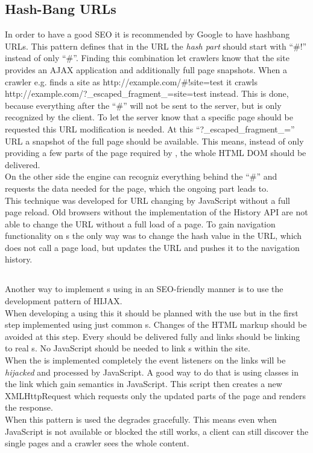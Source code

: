 \subsection{Hash-Bang URLs\label{hashbangurls}}
In order to have a good SEO it is recommended by Google to have hashbang URLs.
This pattern defines that in the URL the \emph{hash part} should start with \enquote{\#!} instead of only \enquote{\#}.
Finding this combination let crawlers know that the site provides an AJAX application and additionally full page snapshots.
When a crawler e.g. finds a site as http://example.com/\#!site=test it crawls \newline http://example.com/?\_escaped\_fragment\_=site=test instead.
This is done, because everything after the \enquote{\#} will not be sent to the server, but is only recognized by the client.
To let the server know that a specific page should be requested this URL modification is needed.
At this \enquote{?\_escaped\_fragment\_=} URL a snapshot of the full page should be available.
This means, instead of only providing a few parts of the page required by \ajax{}, the whole HTML DOM should be delivered.
\\
On the other side the \ajax{} engine can recogniz everything behind the \enquote{\#} and requests the data needed for the page, which the ongoing part leads to.
\\
This technique was developed for URL changing by JavaScript without a full page reload.
Old browsers without the implementation of the History API are not able to change the URL without a full load of a page.
To gain navigation functionality on \singlePageApplication{}s the only way was to change the hash value in the URL, which does not call a page load, but updates the URL and pushes it to the navigation history.

\subsection{\hijax{}\label{hijax}}
Another way to implement \singlePageApplication{}s using \ajax{} in an SEO-friendly manner is to use the development pattern of HIJAX.
\\
When developing a \webSite{} using this it should be planned with the use \ajax{} but in the first step implemented using just common \httpRequest{}s.
Changes of the HTML markup should be avoided at this step.
Every \webPage{} should be delivered fully and links should be linking to real \webPage{}s.
No JavaScript should be needed to link \webPage{}s within the site.
\\
When the \webSite{} is implemented completely the event listeners on the links will be \emph{hijacked} and processed by JavaScript.
A good way to do that is using classes in the link which gain semantics in JavaScript.
This script then creates a new XMLHttpRequest which requests only the updated parts of the page and renders the response.
\\
When this pattern is used the \webSite{} degrades gracefully.
This means even when JavaScript is not available or blocked the \webSite{} still works, a client can still discover the single pages and a crawler sees the whole content.

